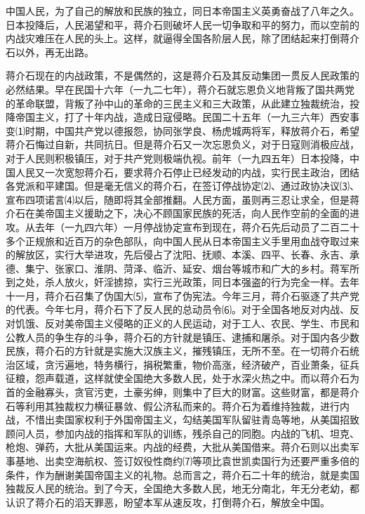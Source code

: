 \documentclass[UTF-8, a5paper, 12pt]{ctexart}
\begin{document}
中国人民，为了自己的解放和民族的独立，同日本帝国主义英勇奋战了八年之久。日本投降后，人民渴望和平，蒋介石则破坏人民一切争取和平的努力，而以空前的内战灾难压在人民的头上。这样，就逼得全国各阶层人民，除了团结起来打倒蒋介石以外，再无出路。

蒋介石现在的内战政策，不是偶然的，这是蒋介石及其反动集团一贯反人民政策的必然结果。早在民国十六年（一九二七年），蒋介石就忘恩负义地背叛了国共两党的革命联盟，背叛了孙中山的革命的三民主义和三大政策，从此建立独裁统治，投降帝国主义，打了十年内战，造成日寇侵略。民国二十五年（一九三六年）西安事变⑴时期，中国共产党以德报怨，协同张学良、杨虎城两将军，释放蒋介石，希望蒋介石悔过自新，共同抗日。但是蒋介石又一次忘恩负义，对于日寇则消极应战，对于人民则积极镇压，对于共产党则极端仇视。前年（一九四五年）日本投降，中国人民又一次宽恕蒋介石，要求蒋介石停止已经发动的内战，实行民主政治，团结各党派和平建国。但是毫无信义的蒋介石，在签订停战协定⑵、通过政协决议⑶、宣布四项诺言⑷以后，随即将其全部推翻。人民方面，虽则再三忍让求全，但是蒋介石在美帝国主义援助之下，决心不顾国家民族的死活，向人民作空前的全面的进攻。从去年（一九四六年）一月停战协定宣布到现在，蒋介石先后动员了二百二十多个正规旅和近百万的杂色部队，向中国人民从日本帝国主义手里用血战夺取过来的解放区，实行大举进攻，先后侵占了沈阳、抚顺、本溪、四平、长春、永吉、承德、集宁、张家口、淮阴、菏泽、临沂、延安、烟台等城市和广大的乡村。蒋军所到之处，杀人放火，奸淫掳掠，实行三光政策，同日本强盗的行为完全一样。去年十一月，蒋介石召集了伪国大⑸，宣布了伪宪法。今年三月，蒋介石驱逐了共产党的代表。今年七月，蒋介石下了反人民的总动员令⑹。对于全国各地反对内战、反对饥饿、反对美帝国主义侵略的正义的人民运动，对于工人、农民、学生、市民和公教人员的争生存的斗争，蒋介石的方针就是镇压、逮捕和屠杀。对于国内各少数民族，蒋介石的方针就是实施大汉族主义，摧残镇压，无所不至。在一切蒋介石统治区域，贪污遍地，特务横行，捐税繁重，物价高涨，经济破产，百业萧条，征兵征粮，怨声载道，这样就使全国绝大多数人民，处于水深火热之中。而以蒋介石为首的金融寡头，贪官污吏，土豪劣绅，则集中了巨大的财富。这些财富，都是蒋介石等利用其独裁权力横征暴敛、假公济私而来的。蒋介石为着维持独裁，进行内战，不惜出卖国家权利于外国帝国主义，勾结美国军队留驻青岛等地，从美国招致顾问人员，参加内战的指挥和军队的训练，残杀自己的同胞。内战的飞机、坦克、枪炮、弹药，大批从美国运来。内战的经费，大批从美国借来。蒋介石则以出卖军事基地、出卖空海航权、签订奴役性商约⑺等项比袁世凯卖国行为还要严重多倍的条件，作为酬谢美国帝国主义的礼物。总而言之，蒋介石二十年的统治，就是卖国独裁反人民的统治。到了今天，全国绝大多数人民，地无分南北，年无分老幼，都认识了蒋介石的滔天罪恶，盼望本军从速反攻，打倒蒋介石，解放全中国。
\end{document}
